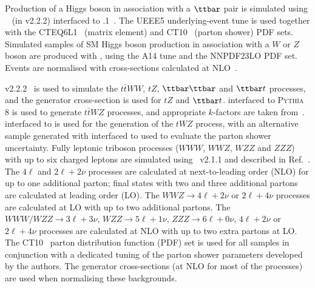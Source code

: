 Production of a Higgs boson in association with a $\ttbar$ pair is simulated using \AMCATNLO~\cite{Alwall:2014hca} 
(in \MADGRAPH v2.2.2) interfaced to .1~\cite{Corcella:2000bw}.  
The UEEE5 underlying-event tune is used together with the CTEQ6L1~\cite{Pumplin:2002vw} (matrix element) and CT10~\cite{Lai:2010vv} (parton shower) PDF sets.
Simulated samples of SM Higgs boson production in association with a $W$ or $Z$ boson are produced with , using the \textsc{A14} tune and the \textsc{NNPDF23LO} PDF set. Events are normalised with cross-sections calculated at NLO~\cite{Dittmaier:2012vm}.

\MADGRAPH v2.2.2~\cite{Alwall:2011uj} is used to simulate the $t\bar{t}WW$, $tZ$, $\ttbar\ttbar$ and $\ttbar t$ processes, and the generator cross-section is used for $tZ$ and $\ttbar t$. \MADGRAPH interfaced to \textsc{Pythia} 8 is used to generate $t\bar{t} WZ$ processes, and appropriate $k$-factors are taken from~\cite{Alwall:2014hca}. \AMCATNLO interfaced to  is used for the generation of the $tWZ$ process, with an alternative sample generated with \AMCATNLO interfaced to \HERWIG used to evaluate the parton shower uncertainty.  
Fully leptonic triboson processes ($WWW$, $WWZ$, $WZZ$ and $ZZZ$) with up to six charged leptons are simulated using \SHERPA~v2.1.1 
and described in Ref.~\cite{ATL-PHYS-PUB-2016-002}. 
The $4\ell$ and $2\ell+2\nu$ processes are calculated at next-to-leading order (NLO) for up to one additional parton; 
final states with two and three additional partons are calculated at leading order (LO). 
The $WWZ\to 4\ell+2\nu$ or $2\ell+4\nu$ processes are calculated at LO with up to two additional partons. 
The $WWW/WZZ\to 3\ell+3\nu$, $WZZ\to 5\ell+1\nu$, $ZZZ\to 6\ell+0\nu$, $4\ell+2\nu$ or $2\ell+4\nu$ processes 
are calculated at NLO with up to two extra partons at LO. 
The CT10~\cite{Lai:2010vv} parton distribution function (PDF) set is used for all \SHERPA samples in conjunction with 
a dedicated tuning of the parton shower parameters developed by the \SHERPA authors. 
The generator cross-sections (at NLO for most of the processes) are used when normalising these backgrounds.


